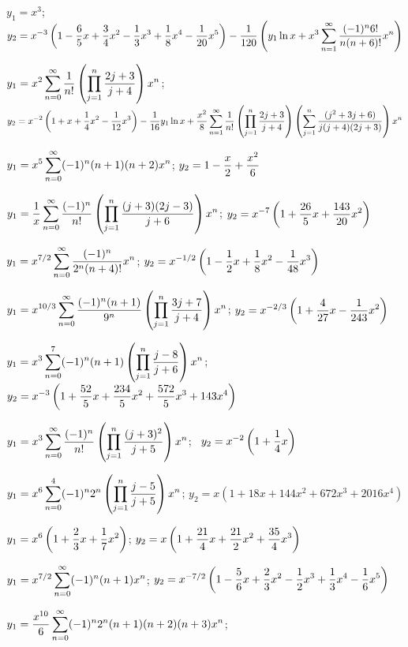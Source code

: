 $y_1=x^3$;\;   $y_2=\displaystyle{x^{-3}\left(1-\frac{6}{5}x+\frac{3}{4}x^2-\frac{1}{3}x^3
+\frac{1}{8}x^4-\frac{1}{20}x^5\right)
-\frac{1}{120}\left(y_1\ln x+x^3\sum_{n=1}^\infty\frac{(-1)^n6!}{n(n+6)!}
x^n\right)}$

$\displaystyle y_1=x^2\sum_{n=0}^\infty\frac{1}{n!}\left(\prod_{j=1}^n\frac{2j+3}{j+4}\right)x^n$;
$\displaystyle y_2=x^{-2}\left(1+x+\frac{1}{4}x^2-\frac{1}{12}x^3\right)-\frac{1}{16}
y_1\ln x+\frac{x^2}{8}\sum_{n=1}^\infty\frac{1}{n!}\left(\prod_{j=1}^n\frac{2j+3}{j+4}
\right)\left(\sum_{j=1}^n\frac{(j^2+3j+6)}{j(j+4)(2j+3)}\right)x^n$

$y_1=\displaystyle{x^5\sum_{n=0}^\infty(-1)^n(n+1)(n+2)x^n}$;\;
$y_2=\displaystyle{1-\frac{x}{2}+\frac{x^2}{6}}$

$y_1=\displaystyle{\frac{1}{x}\sum_{n=0}^\infty\frac{(-1)^n}{n!}\left(\prod_{j=1}^n\frac{(j+3)(2j-3)}{j+6}\right)x^n}$;\;
$y_2=\displaystyle{x^{-7}\left(1+\frac{26}{5}x+\frac{143}{20}x^2\right)}$

$y_1=\displaystyle{x^{7/2}\sum_{n=0}^\infty\frac{(-1)^n}{2^n(n+4)!}x^n}$;\;
$y_2=\displaystyle{x^{-1/2}\left(1-\frac{1}{2}x+\frac{1}{8}x^2-\frac{1}{48}x^3\right)}$

$y_1=\displaystyle{x^{10/3}\sum_{n=0}^\infty\frac{(-1)^n(n+1)}{9^n}\left(\prod_{j=1}^n
\frac{3j+7}{j+4}\right)x^n}$;\;
$y_2=\displaystyle{x^{-2/3}\left(1+\frac{4}{27}x-\frac{1}{243}x^2\right)}$

$y_1=\displaystyle{x^3\sum_{n=0}^7(-1)^n(n+1)\left(\prod_{j=1}^n\frac{j-8}{j+6}\right)x^n}$;\;
$y_2=\displaystyle x^{-3}\left(1+\frac{52}{5}x+\frac{234}{5}x^2+\frac{572}{5}x^3+
143x^4\right)$

$y_1=\displaystyle{x^3\sum_{n=0}^\infty\frac{(-1)^n}{n!}\left(\prod_{j=1}^n\frac{(j+3)^2}{j+5}\right)x^n}$;\;   \, $y_2=\displaystyle{x^{-2}\left(1+\frac{1}{4}x\right)}$

$y_1=\displaystyle{x^6\sum_{n=0}^4(-1)^n2^n\left(\prod_{j=1}^n\frac{j-5}{j+5}\right) x^n}$;\;
$y_2=x(1+18x+144x^2+672x^3+2016x^4)$

$y_1=\displaystyle{x^6\left(1+\frac{2}{3}x+\frac{1}{7}x^2\right)}$;\;
$y_2=\displaystyle{x\left(1+\frac{21}{4}x+\frac{21}{2}x^2+\frac{35}{4}x^3\right)}$

$y_1=\displaystyle{x^{7/2}\sum_{n=0}^\infty(-1)^n(n+1)x^n}$;\;
$y_2=x^{-7/2}
\displaystyle\left(1-\frac{5}{6}x+\frac{2}{3}x^2-
\frac{1}{2}x^3+\frac{1}{3}x^4-\frac{1}{6}x^5\right)$

$y_1=\displaystyle{\frac{x^{10}}{6}\sum_{n=0}^\infty(-1)^n2^n(n+1)(n+2)(n+3)x^n}$;\;

